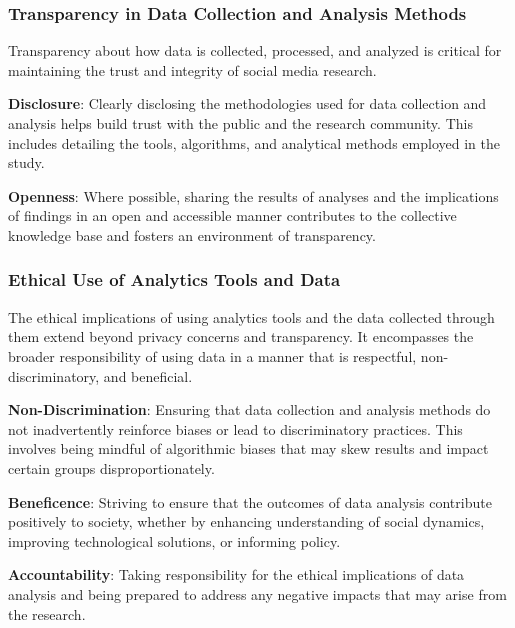 \documentclass[
]{book}
\begin{document}
\hypertarget{transparency-in-data-collection-and-analysis-methods}{%
\subsubsection*{Transparency in Data Collection and Analysis Methods}\label{transparency-in-data-collection-and-analysis-methods}}

Transparency about how data is collected, processed, and analyzed is critical for maintaining the trust and integrity of social media research.

\textbf{Disclosure}: Clearly disclosing the methodologies used for data collection and analysis helps build trust with the public and the research community. This includes detailing the tools, algorithms, and analytical methods employed in the study.

\textbf{Openness}: Where possible, sharing the results of analyses and the implications of findings in an open and accessible manner contributes to the collective knowledge base and fosters an environment of transparency.

\hypertarget{ethical-use-of-analytics-tools-and-data}{%
\subsubsection*{Ethical Use of Analytics Tools and Data}\label{ethical-use-of-analytics-tools-and-data}}

The ethical implications of using analytics tools and the data collected through them extend beyond privacy concerns and transparency. It encompasses the broader responsibility of using data in a manner that is respectful, non-discriminatory, and beneficial.

\textbf{Non-Discrimination}: Ensuring that data collection and analysis methods do not inadvertently reinforce biases or lead to discriminatory practices. This involves being mindful of algorithmic biases that may skew results and impact certain groups disproportionately.

\textbf{Beneficence}: Striving to ensure that the outcomes of data analysis contribute positively to society, whether by enhancing understanding of social dynamics, improving technological solutions, or informing policy.

\textbf{Accountability}: Taking responsibility for the ethical implications of data analysis and being prepared to address any negative impacts that may arise from the research.
\end{document}
